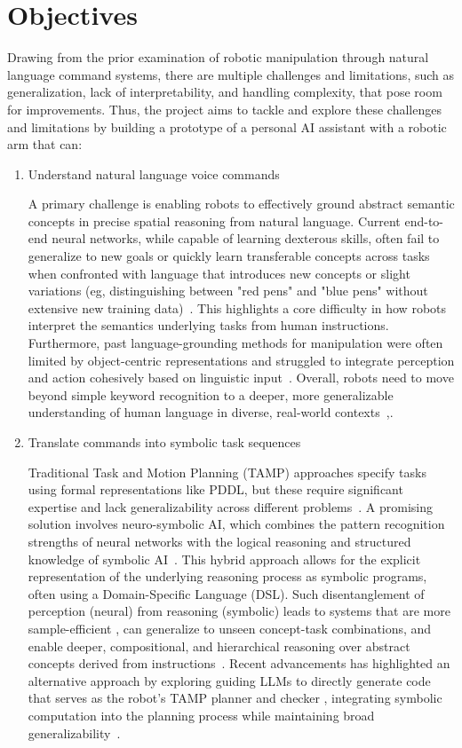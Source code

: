 \documentclass[12pt]{extarticle}
\begin{document}
\section{Objectives}
Drawing from the prior examination of robotic manipulation through natural language command systems, there are multiple challenges and limitations, such as generalization, lack of interpretability, and handling complexity, that pose room for improvements. Thus, the project aims to tackle and explore these challenges and limitations by building a prototype of a personal AI assistant with a robotic arm that can:
\begin{enumerate}
  \item Understand natural language voice commands

  A primary challenge is enabling robots to effectively ground abstract semantic concepts in precise spatial reasoning from natural language. Current end-to-end neural networks, while capable of learning dexterous skills, often fail to generalize to new goals or quickly learn transferable concepts across tasks when confronted with language that introduces new concepts or slight variations (eg, distinguishing between "red pens" and "blue pens" without extensive new training data)~\cite{enhancing-interpret}. This highlights a core difficulty in how robots interpret the semantics underlying tasks from human instructions. Furthermore, past language-grounding methods for manipulation were often limited by object-centric representations and struggled to integrate perception and action cohesively based on linguistic input~\cite{cliport}. Overall, robots need to move beyond simple keyword recognition to a deeper, more generalizable understanding of human language in diverse, real-world contexts~\cite{enhancing-interpret},\cite{learning-neuro-symbolic}.

  \item Translate commands into symbolic task sequences

  Traditional Task and Motion Planning (TAMP) approaches specify tasks using formal representations like PDDL, but these require significant expertise and lack generalizability across different problems~\cite{code-as-symbolic-planner}. A promising solution involves neuro-symbolic AI, which combines the pattern recognition strengths of neural networks with the logical reasoning and structured knowledge of symbolic AI~\cite{nsai}. This hybrid approach allows for the explicit representation of the underlying reasoning process as symbolic programs, often using a Domain-Specific Language (DSL). Such disentanglement of perception (neural) from reasoning (symbolic) leads to systems that are more sample-efficient , can generalize to unseen concept-task combinations, and enable deeper, compositional, and hierarchical reasoning over abstract concepts derived from instructions~\cite{enhancing-interpret}. Recent advancements has highlighted an alternative approach by exploring guiding LLMs to directly generate code that serves as the robot's TAMP planner and checker , integrating symbolic computation into the planning process while maintaining broad generalizability~\cite{code-as-symbolic-planner}.


\end{enumerate}
\end{document}
